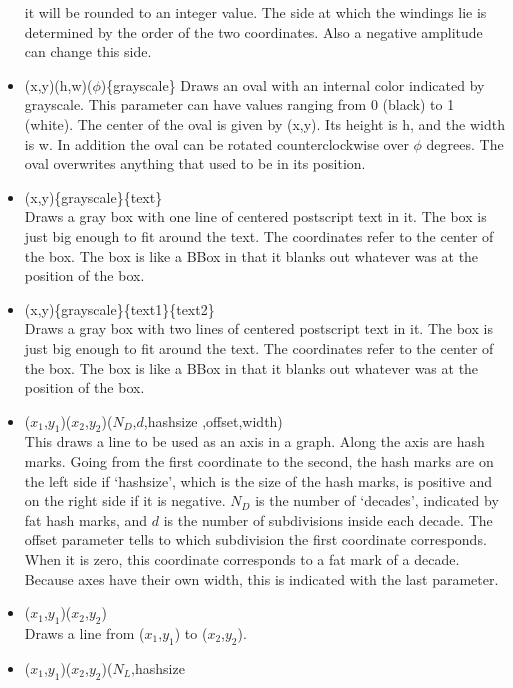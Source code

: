 \begin{itemize}
    it will be rounded to an integer value. The side at which the 
    windings lie is determined by the order of the two coordinates. Also 
    a negative amplitude can change this side.
\item {}(x,y)(h,w)($\phi$)\{grayscale\} Draws an oval with
    an internal color indicated by grayscale. This parameter can have 
    values ranging from 0 (black) to 1 (white). The center of the oval 
    is given by (x,y). Its height is h, and the width is w. In addition 
    the oval can be rotated counterclockwise over $\phi$ degrees. The 
    oval overwrites anything that used to be in its position.
\item {}(x,y)\{grayscale\}\{text\} \hfill \\
    Draws a gray box with one line of centered postscript text in it. The 
    box is just big enough to fit around the text. The coordinates refer to 
    the center of the box. The box is like a BBox in that it blanks out 
    whatever was at the position of the box.
\item {}(x,y)\{grayscale\}\{text1\}\{text2\} \hfill \\
    Draws a gray box with two lines of centered postscript text in it. 
    The box is just big enough to fit around the text. The coordinates 
    refer to the center of the box. The box is like a BBox in that it 
    blanks out whatever was at the position of the box.
\item {}($x_1$,$y_1$)($x_2$,$y_2$)($N_D$,$d$,hashsize
    ,offset,width) \hfill \\
    This draws a line to be used as an axis in a graph. Along the axis 
    are hash marks. Going from the first coordinate to the second, the 
    hash marks are on the left side if `hashsize', which is the size of the 
    hash marks, is positive and on the right side if it is negative. 
    $N_D$ is the number of `decades', indicated by fat hash marks, and 
    $d$ is the number of subdivisions inside each decade. The offset 
    parameter tells to which subdivision the first coordinate 
    corresponds. When it is zero, this coordinate corresponds to a fat 
    mark of a decade. Because axes have their own width, this is 
    indicated with the last parameter.
\item {}($x_1$,$y_1$)($x_2$,$y_2$) \hfill \\
    Draws a line from ($x_1$,$y_1$) to ($x_2$,$y_2$).
\item {}($x_1$,$y_1$)($x_2$,$y_2$)($N_L$,hashsize

\end{itemize}
